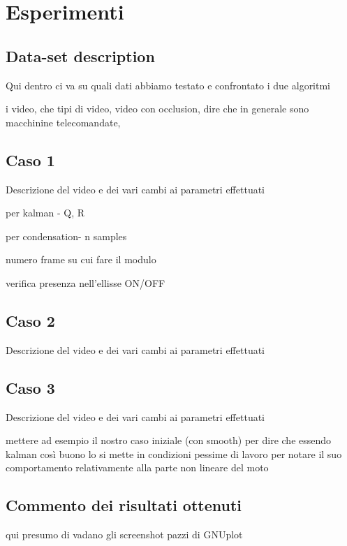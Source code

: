 
\section{Esperimenti}

\subsection{Data-set description}
Qui dentro ci va su quali dati abbiamo testato e confrontato i due algoritmi

i video, che tipi di video, video con occlusion, dire che in generale sono macchinine telecomandate, 

\subsection{Caso 1}
Descrizione del video e dei vari cambi ai parametri effettuati 

per kalman - Q, R

per condensation- n samples

numero frame su cui fare il modulo

verifica presenza nell'ellisse ON/OFF
\subsection{Caso 2}
Descrizione del video e dei vari cambi ai parametri effettuati
\subsection{Caso 3}
Descrizione del video e dei vari cambi ai parametri effettuati

mettere ad esempio il nostro caso iniziale (con smooth) per dire che essendo kalman così buono lo si mette in condizioni pessime di lavoro per notare il suo comportamento relativamente alla parte non lineare del moto
\subsection{Commento dei risultati ottenuti}
qui presumo di vadano gli screenshot pazzi di GNUplot

